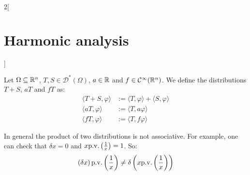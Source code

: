 \documentclass[../../../main_math.tex]{subfiles}
\begin{document}
\begin{multicols}{2}[\section{Harmonic analysis}]
\begin{definition}
  \end{definition}
  \begin{definition}
    Let $\Omega\subseteq \mathbb{R}^n$, $T,S\in\mathcal{D}^*(\Omega)$, $a\in\mathbb{R}$ and $f\in\mathcal{C}^\infty(\mathbb{R}^n)$. We define the distributions $T+S$, $aT$ and $fT$ as:
    \begin{align*}
      \langle T+S,\varphi\rangle & := \langle T, \varphi\rangle+\langle S, \varphi\rangle \\
      \langle aT,\varphi\rangle  & := \langle T, a\varphi\rangle                          \\
      \langle fT,\varphi\rangle  & := \langle T, f\varphi\rangle
    \end{align*}
  \end{definition}
  \begin{remark}
    In general the product of two distributions is not associative. For example, one can check that $\delta x=0$ and $x\mathrm{p.v.}\left(\frac{1}{x}\right)=1$. So:
    $$\left(\delta x\right)\mathrm{p.v.}\left(\frac{1}{x}\right)\ne\delta \left(x\mathrm{p.v.}\left(\frac{1}{x}\right)\right)$$
  \end{remark}

\end{multicols}
\end{document}
